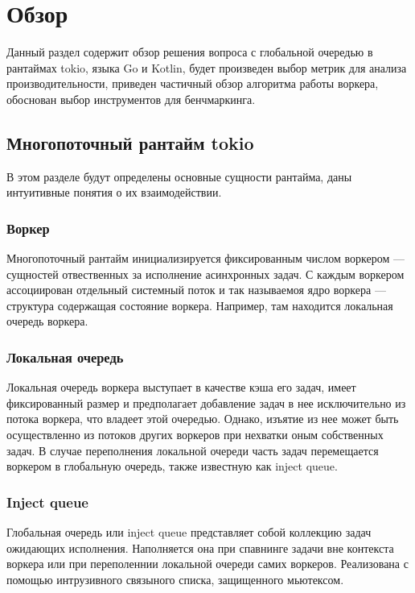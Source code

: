 
\section{Обзор}

Данный раздел содержит обзор решения вопроса с глобальной очередью в рантаймах tokio, языка Go и Kotlin, будет произведен выбор метрик для анализа производительности, приведен частичный обзор алгоритма работы воркера, обоснован выбор инструментов для бенчмаркинга.

\subsection{Многопоточный рантайм tokio}

В этом разделе будут определены основные сущности рантайма, даны интуитивные понятия о их взаимодействии.

\subsubsection{Воркер}

Многопоточный рантайм инициализируется фиксированным числом воркером --- сущностей отвественных за исполнение асинхронных задач. С каждым воркером ассоциирован отдельный системный поток и так называемоя ядро воркера --- структура содержащая состояние воркера. Например, там находится локальная очередь воркера.

\subsubsection{Локальная очередь}

Локальная очередь воркера выступает в качестве кэша его задач, имеет фиксированный размер и предполагает добавление задач в нее исключительно из потока воркера, что владеет этой очередью. Однако, изъятие из нее может быть осуществленно из потоков других воркеров при нехватки оным собственных задач. В случае переполнения локальной очереди часть задач перемещается воркером в глобальную очередь, также известную как inject queue.

\subsubsection{Inject queue}

Глобальная очередь или inject queue представляет собой коллекцию задач ожидающих исполнения.  Наполняется она при спавнинге задачи вне контекста воркера или при переполеннии локальной очереди самих воркеров. Реализована с помощью интрузивного связыного списка, защищенного мьютексом.

